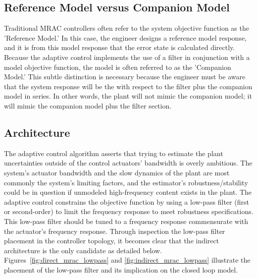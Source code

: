 \subsection{Reference Model versus Companion Model}
Traditional \ac{MRAC} controllers often refer to the system objective function as the 'Reference Model.'  In this case, the engineer designs a reference model response, and it is from this model response that the error state is calculated directly.  Because the \Lone adaptive control implements the use of a filter in conjunction with a model objective function, the model is often referred to as the 'Companion Model.'  This subtle distinction is necessary because the engineer must be aware that the system response will be the with respect to the filter plus the companion model in series.  In other words, the plant will not mimic the companion model; it will mimic the companion model plus the filter section.

\subsection{\Lone Architecture}
The \Lone adaptive control algorithm asserts that trying to estimate the plant uncertainties outside of the control actuators' bandwidth is overly ambitious.  The system's actuator bandwidth and the slow dynamics of the plant are most commonly the system's limiting factors, and the estimator's robustness/stability could be in question if unmodeled high-frequency content exists in the plant.  %
The \Lone adaptive control constrains the objective function by using a low-pass filter (first or second-order) to limit the frequency response to meet robustness specifications.  This low-pass filter should be tuned to a frequency response commensurate with the actuator's frequency response.  Through inspection the low-pass filter placement in the controller topology, it becomes clear that the indirect architecture is the only candidate as detailed below.  Figures~\ref{fig:direct_mrac_lowpass} and \ref{fig:indirect_mrac_lowpass} illustrate the placement of the low-pass filter and its implication on the closed loop model. 

